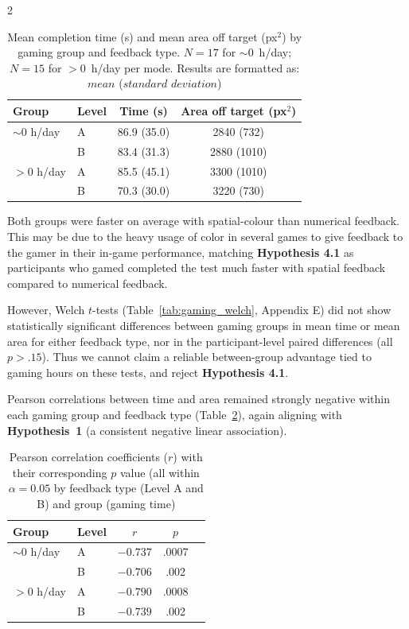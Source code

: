 \documentclass[a4paper,12pt]{article}
\begin{document}
\begin{multicols}{2}
\begin{table}[H]
  \centering
  \caption{Mean completion time (s) and mean area off target (px$^2$) by gaming group and feedback type. $N = 17$ for $\sim$0~h/day; $N = 15$ for $>0$~h/day per mode. Results are formatted as: $mean$ ($standard$ $deviation$)}
  \footnotesize
  \label{tab:gaming_desc}
  \begin{tabularx}{\columnwidth}{@{}llcc@{}}
    \toprule
    Group & Level & Time (s) & Area off target (px$^2$) \\
    \midrule
    $\sim$0 h/day & A      & 86.9 (35.0) & 2840 (732) \\
                  & B & 83.4 (31.3) & 2880 (1010) \\
    $>$0 h/day    & A     & 85.5 (45.1) & 3300 (1010) \\
                  & B & 70.3 (30.0) & 3220 (730) \\
    \bottomrule
  \end{tabularx}
\end{table}

Both groups were faster on average with spatial-colour than numerical feedback. This may be due to the heavy usage of color in several games to give feedback to the gamer in their in-game performance, matching \textbf{Hypothesis 4.1} as participants who gamed completed the test much faster with spatial feedback compared to numerical feedback. 

However, Welch $t$-tests (Table~\ref{tab:gaming_welch}, Appendix E) did not show statistically significant differences between gaming groups in mean time or mean area for either feedback type, nor in the participant-level paired differences (all $p > .15$). Thus we cannot claim a reliable between-group advantage tied to gaming hours on these tests, and reject \textbf{Hypothesis 4.1}. 

Pearson correlations between time and area remained strongly negative within each gaming group and feedback type (Table~\ref{tab:gaming_pearson}), again aligning with \textbf{Hypothesis~1} (a consistent negative linear association).

\begin{table}[H]
  \centering
  \caption{Pearson correlation coefficients ($r$) with their corresponding $p$ value (all within $\alpha = 0.05$ by feedback type (Level A and B) and group (gaming time)}
  \label{tab:gaming_pearson}
  \footnotesize %
  \begin{tabular}{llccc}
    \toprule
    Group & Level & $r$ & $p$ \\
    \midrule
    $\sim$0 h/day & A      & $-0.737$ & .0007 \\
                  & B & $-0.706$ & .002 \\ \addlinespace
    $>$0 h/day    & A      & $-0.790$ & .0008  \\
                  & B & $-0.739$ & .002 \\
    \bottomrule
  \end{tabular}
  \vspace{-10pt}
\end{table}




\end{multicols}
\end{document}
